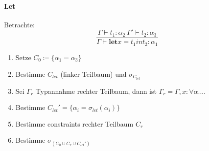 \paragraph{Let}
Betrachte:
$$\frac{\Gamma \vdash t_1: \alpha_2 \medspace \Gamma' \vdash t_2: \alpha_3}{\Gamma \vdash \textbf{let} x = t_1 in t_2 : \alpha_1}$$

\begin{enumerate}
	\item Setze $C_0 \coloneqq \{ \alpha_1 = \alpha_3 \}$
	\item Bestimme $C_{let}$ (linker Teilbaum) und $\sigma_{C_{let}}$
	\item Sei $\Gamma_r$ Typannahme rechter Teilbaum, dann ist $\Gamma_r = \Gamma, x: \forall \alpha. ...$
	\item Bestimme $C_{let}' = \{\alpha_i = \sigma_{let}(\alpha_i)\}$
	\item Bestimme constraints rechter Teilbaum $C_r$
	\item Bestimme $\sigma_{(C_0 \cup C_r \cup C_{let}')}$
\end{enumerate}